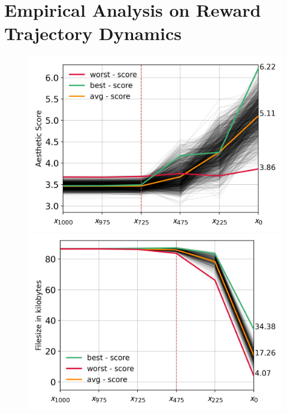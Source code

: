 \section{Empirical Analysis on Reward Trajectory Dynamics}\label{sec:empirical-analysis}

\begin{figure}[ht]
  \centering
  \begin{minipage}{0.5\textwidth}
      \centering
      \includegraphics[width=1\textwidth]{img/results/1k-trajectories-aestheic-score-single.png} %
  \end{minipage}\hfill
  \begin{minipage}{0.5\textwidth}
      \centering
      \includegraphics[width=1\textwidth]{img/results/1k-trajectories-jpeg-size-single.png} %

\end{minipage}
\end{figure}
